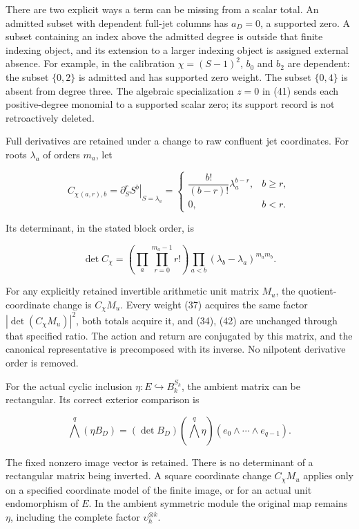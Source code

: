 There are two explicit ways a term can be missing from a scalar total. An admitted subset with dependent full-jet columns has \(a_D=0\), a supported zero. A subset containing an index above the admitted degree is outside that finite indexing object, and its extension to a larger indexing object is assigned external absence. For example, in the calibration \(\chi=(S-1)^2\), \(b_0\) and \(b_2\) are dependent: the subset \(\{0,2\}\) is admitted and has supported zero weight. The subset \(\{0,4\}\) is absent from degree three. The algebraic specialization \(z=0\) in (41) sends each positive-degree monomial to a supported scalar zero; its support record is not retroactively deleted.

Full derivatives are retained under a change to raw confluent jet coordinates. For roots \(\lambda_a\) of orders \(m_a\), let

\[
 C_\chi{}_{(a,r),b}
 =\left.\partial_S^rS^b\right|_{S=\lambda_a}
 =\begin{cases}\dfrac{b!}{(b-r)!}\lambda_a^{b-r},&b\ge r,\\0,&b<r.
 \end{cases}                                                     \tag{44}
\]

Its determinant, in the stated block order, is

\[
 \det C_\chi
 =\left(\prod_a\prod_{r=0}^{m_a-1}r!\right)
  \prod_{a<b}(\lambda_b-\lambda_a)^{m_am_b}.                      \tag{45}
\]

For any explicitly retained invertible arithmetic unit matrix \(M_u\), the quotient-coordinate change is \(C_\chi M_u\). Every weight (37) acquires the same factor \(|\det(C_\chi M_u)|^2\), both totals acquire it, and (34), (42) are unchanged through that specified ratio. The action and return are conjugated by this matrix, and the canonical representative is precomposed with its inverse. No nilpotent derivative order is removed.

For the actual cyclic inclusion \(\eta:E\hookrightarrow B_k^{S_k}\), the ambient matrix can be rectangular. Its correct exterior comparison is

\[
 \bigwedge^q(\eta B_D)
 = (\det B_D)(\bigwedge^q\eta)(e_0\wedge\cdots\wedge e_{q-1}).
\]

The fixed nonzero image vector is retained. There is no determinant of a rectangular matrix being inverted. A square coordinate change \(C_\chi M_u\) applies only on a specified coordinate model of the finite image, or for an actual unit endomorphism of \(E\). In the ambient symmetric module the original map remains \(\eta\), including the complete factor \(\upsilon_h^{\otimes k}\).


